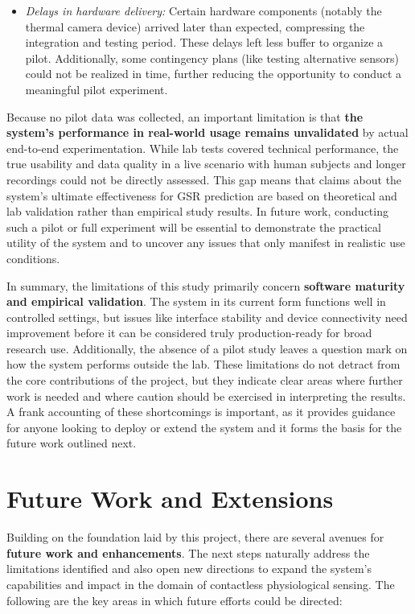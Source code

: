 \documentclass[11pt,a4paper]{report}
\begin{document}
\begin{itemize}
\item \textit{Delays in hardware delivery:} Certain hardware components (notably
  the thermal camera device) arrived later than expected, compressing
  the integration and testing period. These delays left less buffer to
  organize a pilot. Additionally, some contingency plans (like testing
  alternative sensors) could not be realized in time, further reducing
  the opportunity to conduct a meaningful pilot experiment.

\end{itemize}
Because no pilot data was collected, an important limitation is that
\textbf{the system's performance in real-world usage remains unvalidated} by
actual end-to-end experimentation. While lab tests covered technical
performance, the true usability and data quality in a live scenario with
human subjects and longer recordings could not be directly assessed.
This gap means that claims about the system's ultimate effectiveness for
GSR prediction are based on theoretical and lab validation rather than
empirical study results. In future work, conducting such a pilot or full
experiment will be essential to demonstrate the practical utility of the
system and to uncover any issues that only manifest in realistic use
conditions.

In summary, the limitations of this study primarily concern \textbf{software
maturity and empirical validation}. The system in its current form
functions well in controlled settings, but issues like interface
stability and device connectivity need improvement before it can be
considered truly production-ready for broad research use. Additionally,
the absence of a pilot study leaves a question mark on how the system
performs outside the lab. These limitations do not detract from the core
contributions of the project, but they indicate clear areas where
further work is needed and where caution should be exercised in
interpreting the results. A frank accounting of these shortcomings is
important, as it provides guidance for anyone looking to deploy or
extend the system and it forms the basis for the future work outlined
next.

\section{Future Work and Extensions}

Building on the foundation laid by this project, there are several
avenues for \textbf{future work and enhancements}. The next steps naturally
address the limitations identified and also open new directions to
expand the system's capabilities and impact in the domain of contactless
physiological sensing. The following are the key areas in which future
efforts could be directed:
\end{document}
